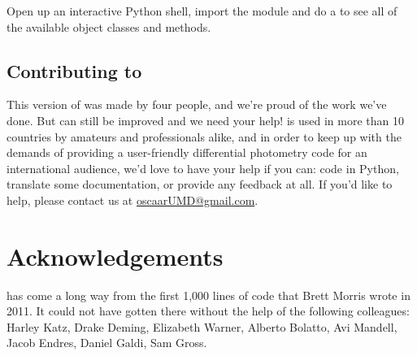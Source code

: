 \documentclass{article}
\begin{document}
\noindent Open up an interactive Python shell, import the module and do a  to see all of the available object classes and methods. 



\subsection{Contributing to \oscaar}
This version of \oscaar was made by four people, and we're proud of the work we've done. But \oscaar can still be improved and we need your help! \oscaar is used in more than 10 countries by amateurs and professionals alike, and in order to keep up with the demands of providing a user-friendly differential photometry code for an international audience, we'd love to have your help if you can: code in Python, translate some documentation, or provide any feedback at all. If you'd like to help, please contact us at \href{mailto:oscaarUMD@gmail.com}{oscaarUMD@gmail.com}. 




\section{Acknowledgements}
\oscaar has come a long way from the first 1,000 lines of code that Brett Morris wrote in 2011. It could not have gotten there without the help of the following colleagues: 
Harley Katz, Drake Deming, Elizabeth Warner, Alberto Bolatto, Avi Mandell, Jacob Endres, Daniel Galdi, Sam Gross.

	
\end{document}
